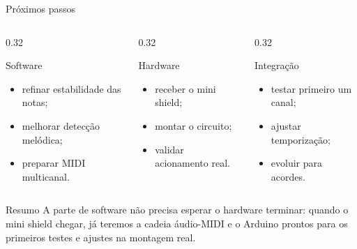 \documentclass{beamer}
\begin{document}
\begin{frame}{Próximos passos}
    \begin{columns}[T,onlytextwidth]
        \begin{column}{0.32\textwidth}
            \begin{block}{Software}
                \begin{itemize}
                    \item refinar estabilidade das notas;
                    \item melhorar detecção melódica;
                    \item preparar MIDI multicanal.
                \end{itemize}
            \end{block}
        \end{column}
        \begin{column}{0.32\textwidth}
            \begin{block}{Hardware}
                \begin{itemize}
                    \item receber o mini shield;
                    \item montar o circuito;
                    \item validar acionamento real.
                \end{itemize}
            \end{block}
        \end{column}
        \begin{column}{0.32\textwidth}
            \begin{block}{Integração}
                \begin{itemize}
                    \item testar primeiro um canal;
                    \item ajustar temporização;
                    \item evoluir para acordes.
                \end{itemize}
            \end{block}
        \end{column}
    \end{columns}

    \vspace{0.45cm}

    \begin{alertblock}{Resumo}
        A parte de software não precisa esperar o hardware terminar: quando o
        mini shield chegar, já teremos a cadeia áudio-MIDI e o Arduino prontos
        para os primeiros testes e ajustes na montagem real.
    \end{alertblock}
\end{frame}
\end{document}
